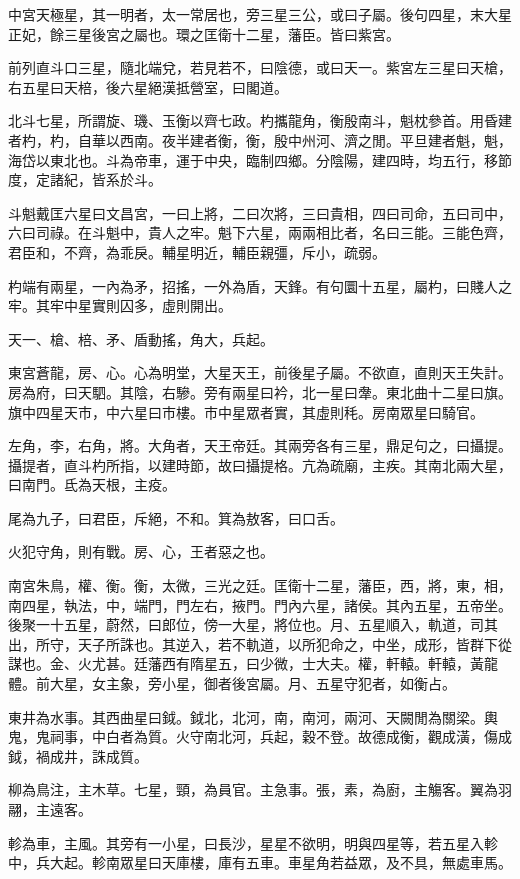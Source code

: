 中宮天極星，其一明者，太一常居也，旁三星三公，或曰子屬。後句四星，末大星正妃，餘三星後宮之屬也。環之匡衛十二星，藩臣。皆曰紫宮。

前列直斗口三星，隨北端兌，若見若不，曰陰德，或曰天一。紫宮左三星曰天槍，右五星曰天棓，後六星絕漢抵營室，曰閣道。

北斗七星，所謂旋、璣、玉衡以齊七政。杓攜龍角，衡殷南斗，魁枕參首。用昏建者杓，杓，自華以西南。夜半建者衡，衡，殷中州河、濟之閒。平旦建者魁，魁，海岱以東北也。斗為帝車，運于中央，臨制四鄉。分陰陽，建四時，均五行，移節度，定諸紀，皆系於斗。

斗魁戴匡六星曰文昌宮，一曰上將，二曰次將，三曰貴相，四曰司命，五曰司中，六曰司祿。在斗魁中，貴人之牢。魁下六星，兩兩相比者，名曰三能。三能色齊，君臣和，不齊，為乖戾。輔星明近，輔臣親彊，斥小，疏弱。

杓端有兩星，一內為矛，招搖，一外為盾，天鋒。有句圜十五星，屬杓，曰賤人之牢。其牢中星實則囚多，虛則開出。

天一、槍、棓、矛、盾動搖，角大，兵起。

東宮蒼龍，房、心。心為明堂，大星天王，前後星子屬。不欲直，直則天王失計。房為府，曰天駟。其陰，右驂。旁有兩星曰衿，北一星曰舝。東北曲十二星曰旗。旗中四星天市，中六星曰市樓。市中星眾者實，其虛則秏。房南眾星曰騎官。

左角，李，右角，將。大角者，天王帝廷。其兩旁各有三星，鼎足句之，曰攝提。攝提者，直斗杓所指，以建時節，故曰攝提格。亢為疏廟，主疾。其南北兩大星，曰南門。氐為天根，主疫。

尾為九子，曰君臣，斥絕，不和。箕為敖客，曰口舌。

火犯守角，則有戰。房、心，王者惡之也。

南宮朱鳥，權、衡。衡，太微，三光之廷。匡衛十二星，藩臣，西，將，東，相，南四星，執法，中，端門，門左右，掖門。門內六星，諸侯。其內五星，五帝坐。後聚一十五星，蔚然，曰郎位，傍一大星，將位也。月、五星順入，軌道，司其出，所守，天子所誅也。其逆入，若不軌道，以所犯命之，中坐，成形，皆群下從謀也。金、火尤甚。廷藩西有隋星五，曰少微，士大夫。權，軒轅。軒轅，黃龍體。前大星，女主象，旁小星，御者後宮屬。月、五星守犯者，如衡占。

東井為水事。其西曲星曰鉞。鉞北，北河，南，南河，兩河、天闕閒為關梁。輿鬼，鬼祠事，中白者為質。火守南北河，兵起，穀不登。故德成衡，觀成潢，傷成鉞，禍成井，誅成質。

柳為鳥注，主木草。七星，頸，為員官。主急事。張，素，為廚，主觴客。翼為羽翮，主遠客。

軫為車，主風。其旁有一小星，曰長沙，星星不欲明，明與四星等，若五星入軫中，兵大起。軫南眾星曰天庫樓，庫有五車。車星角若益眾，及不具，無處車馬。

